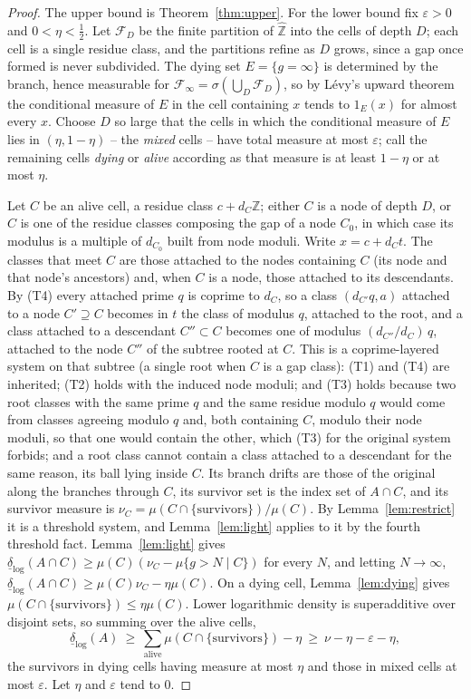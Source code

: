 \documentclass[11pt]{article}
\theoremstyle{plain}
\theoremstyle{definition}
\newcommand{\Zhat}{\widehat{\mathbb{Z}}}
\begin{document}
\begin{proof}
The upper bound is Theorem~\ref{thm:upper}.  For the lower bound
fix $\varepsilon>0$ and $0<\eta<\tfrac12$.  Let $\mathcal{F}_D$ be the finite
partition of $\Zhat$ into the cells of depth $D$; each cell is a
single residue class, and the partitions refine as $D$ grows,
since a gap once formed is never subdivided.  The dying set $E=\{g=\infty\}$ is determined
by the branch, hence measurable for
$\mathcal{F}_\infty=\sigma(\bigcup_D\mathcal{F}_D)$, so by
L\'evy's upward theorem~\cite{Williams} the conditional measure
of $E$ in the cell containing $x$ tends to $1_E(x)$ for almost
every $x$.  Choose $D$ so large that the cells in which the
conditional measure of $E$ lies in $(\eta,1-\eta)$ -- the
\emph{mixed} cells -- have total measure at most $\varepsilon$;
call the remaining cells \emph{dying} or \emph{alive} according
as that measure is at least $1-\eta$ or at most $\eta$.

Let $C$ be an alive cell, a residue class $c+d_C\mathbb{Z}$;
either $C$ is a node of depth $D$, or $C$ is one of the residue
classes composing the gap of a node $C_0$, in which case its
modulus is a multiple of $d_{C_0}$ built from node moduli.  Write
$x=c+d_Ct$.  The classes that meet $C$ are those attached to the
nodes containing $C$ (its node and that node's ancestors) and,
when $C$ is a node, those attached to its descendants.  By (T4)
every attached prime $q$ is coprime to $d_C$, so a class
$(d_{C'}q,a)$ attached to a node $C'\supseteq C$ becomes in $t$
the class of modulus $q$, attached to the root, and a class
attached to a descendant $C''\subset C$ becomes one of modulus
$(d_{C''}/d_C)\,q$, attached to the node $C''$ of the subtree
rooted at $C$.  This is a coprime-layered system on that subtree
(a single root when $C$ is a gap class): (T1) and (T4) are
inherited; (T2) holds with the induced node moduli; and (T3)
holds because two root classes with the same prime $q$ and the
same residue modulo $q$ would come from classes agreeing modulo
$q$ and, both containing $C$, modulo their node moduli, so that
one would contain the other, which (T3) for the original system
forbids; and a root class cannot contain a class attached to a
descendant for the same reason, its ball lying inside $C$.  Its branch drifts are those of the original along the
branches through $C$, its survivor set is the index set of
$A\cap C$, and its survivor measure is
$\nu_C=\mu(C\cap\{\text{survivors}\})/\mu(C)$.  By
Lemma~\ref{lem:restrict} it is a threshold system, and
Lemma~\ref{lem:light} applies to it by the fourth threshold fact.
Lemma~\ref{lem:light} gives
$\underline{\delta}_{\log}(A\cap C)\ge\mu(C)(\nu_C-\mu\{g>N\mid C\})$
for every $N$, and letting $N\to\infty$,
$\underline{\delta}_{\log}(A\cap C)\ge\mu(C)\nu_C-\eta\mu(C)$.
On a dying cell, Lemma~\ref{lem:dying} gives
$\mu(C\cap\{\text{survivors}\})\le\eta\mu(C)$.  Lower
logarithmic density is superadditive over disjoint sets, so
summing over the alive cells,
\[
\underline{\delta}_{\log}(A)\ \ge\
\sum_{\text{alive}}\mu(C\cap\{\text{survivors}\})-\eta
\ \ge\ \nu-\eta-\varepsilon-\eta,
\]
the survivors in dying cells having measure at most $\eta$ and
those in mixed cells at most $\varepsilon$.  Let $\eta$ and
$\varepsilon$ tend to $0$.
\end{proof}
\end{document}
